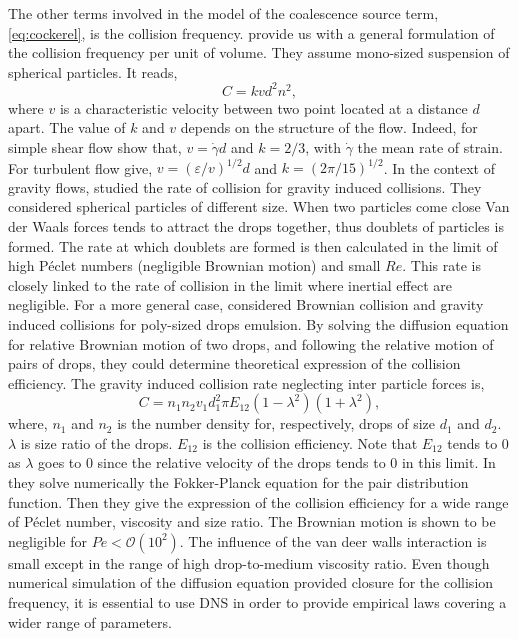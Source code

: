 The other terms involved in the model of the coalescence source term, \ref{eq:cockerel}, is the collision frequency. 
\citet{chesters1991modelling} provide us with a general formulation of the collision frequency per unit of volume.
They assume mono-sized suspension of spherical particles. 
It reads, 
\begin{equation}
    C =  k v d^2 n^2,
\end{equation}
where $v$ is a characteristic velocity between two point located at a distance $d$ apart.
The value of $k$ and $v$ depends on the structure of the flow.
Indeed, for simple shear flow \citet{smoluchowski1917mathematical} show that, $v = \dot{\gamma} d$ and $k=2/3$, with $\dot{\gamma}$ the mean rate of strain. 
For turbulent flow \citet{saffman1956collision} give, $v = (\varepsilon/v)^{1/2} d$ and $k  = (2\pi/15)^{1/2}$.
In the context of gravity flows, \citet{davis1984rate} studied the rate of collision for gravity induced collisions.
They considered spherical particles of different size. 
When two particles come close Van der Waals forces tends to attract the drops together, thus doublets of particles is formed.
The rate at which doublets are formed is then calculated in the limit of high Péclet numbers (negligible Brownian motion) and small $Re$.
This rate is closely linked to the rate of collision in the limit where inertial effect are negligible. 
For a more general case,  \citet{zhang1991rate} considered Brownian collision and gravity induced collisions for poly-sized drops emulsion.
By solving the diffusion equation for relative Brownian motion of two drops, and following the relative motion of pairs of drops, they could determine theoretical expression of the collision efficiency.
The gravity induced collision rate neglecting inter particle forces is, 
\begin{equation}
    C = n_1n_2 v_{1} d_1^2 \pi   E_{12}(1-\lambda^2)(1+\lambda^2), 
\end{equation}
where, $n_1$ and $n_2$ is the number density for, respectively, drops of size $d_1$ and $d_2$.
$\lambda$ is size ratio of the drops.
$E_{12}$ is the collision efficiency. 
Note that $E_{12}$ tends to 0 as $\lambda$ goes to $0$ since the relative velocity of the drops tends to $0$ in this limit.
In \citet{zinchenko1994gravity} they solve numerically the Fokker-Planck equation for the pair distribution function. 
Then they give the expression of the collision efficiency for a wide range of Péclet number, viscosity and size ratio.
The Brownian  motion is shown to be negligible for $Pe< \mathcal{O}(10^2)$.
The influence of the van deer walls interaction is small except in the range of high drop-to-medium viscosity ratio.  
Even though numerical simulation of the diffusion equation provided closure for the collision frequency, it is essential to use DNS in order to provide empirical laws covering a wider range of parameters. 


